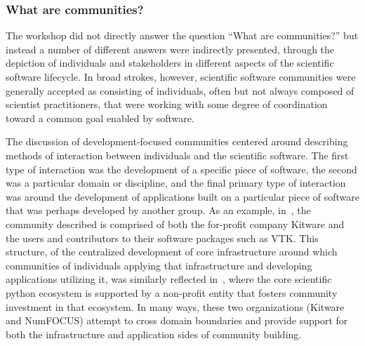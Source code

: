\documentclass[11pt, oneside]{amsart}
\newcommand{\toolname}[1] {\textsf{#1}}
\begin{document}

\subsubsection{What are communities?}

The workshop did not directly answer the question ``What are
communities?'' but instead a number of different answers were
indirectly presented, through the depiction of individuals and
stakeholders in different aspects of the scientific software
lifecycle.  In broad strokes, however, scientific software communities
were generally accepted as consisting of individuals, often but not
always composed of scientist practitioners, that were working with
some degree of coordination toward a common goal enabled by software.

The discussion of development-focused communities centered around
describing methods of interaction between individuals and the
scientific software.  The first type of interaction was the
development of a specific piece of software, the second was a
particular domain or discipline, and the final primary type of
interaction was around the development of applications built on a
particular piece of software that was perhaps developed by another
group.  As an example, in~\cite{Hanwell_WSSSPE}, the community
described is comprised of both the for-profit company
\toolname{Kitware} and the users and contributors to their software
packages such as \toolname{VTK}.  This structure, of the centralized
development of core infrastructure around which communities of
individuals applying that infrastructure and developing applications
utilizing it, was similarly reflected in~\cite{Terrel_WSSSPE}, where
the core scientific python ecosystem is supported by a non-profit
entity that fosters community investment in that ecosystem.  In many
ways, these two organizations (\toolname{Kitware} and
\toolname{NumFOCUS}) attempt to cross domain boundaries and provide
support for both the infrastructure and application sides of community
building.
\end{document}
